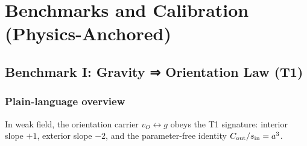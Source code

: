 \documentclass[12pt,a4paper,oneside]{scrreprt}
\begin{document}
\part{Benchmarks and Calibration (Physics-Anchored)}

\chapter{Benchmark I: Gravity ⇒ Orientation Law (T1)}
\section*{Plain-language overview}
In weak field, the orientation carrier $v_O\!\leftrightarrow g$ obeys the T1 signature: interior slope $+1$, exterior slope $-2$, and the parameter-free identity $C_{\rm out}/s_{\rm in}=a^3$.
\end{document}
